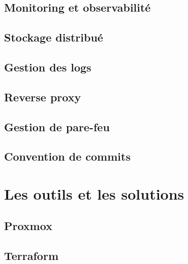 \subsection{Monitoring et observabilité}


\subsection{Stockage distribué}


\subsection{Gestion des logs}


\subsection{Reverse proxy}


\subsection{Gestion de pare-feu}


\subsection{Convention de commits}


\section{Les outils et les solutions}

\subsection{Proxmox}


\subsection{Terraform}

